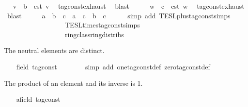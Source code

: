 \begin{isabellebody}
\ \isamarkupfalse%
\ v\ \ {\isacartoucheopen}b\ {\isacharequal}\ {\isasymtau}\isactrlsub c\isactrlsub s\isactrlsub t\ v{\isacartoucheclose}\ \isamarkupfalse%
\ tag{\isacharunderscore}const{\isachardot}exhaust\ \isamarkupfalse%
\ blast\isanewline
\ \ \isamarkupfalse%
\ \isamarkupfalse%
\ w\ \ {\isacartoucheopen}c\ {\isacharequal}\ {\isasymtau}\isactrlsub c\isactrlsub s\isactrlsub t\ w{\isacartoucheclose}\ \isamarkupfalse%
\ tag{\isacharunderscore}const{\isachardot}exhaust\ \isamarkupfalse%
\ blast\isanewline
\ \ \isamarkupfalse%
\ \isamarkupfalse%
\ {\isacartoucheopen}{\isacharparenleft}a\ {\isacharplus}\ b{\isacharparenright}\ {\isacharasterisk}\ c\ {\isacharequal}\ a\ {\isacharasterisk}\ c\ {\isacharplus}\ b\ {\isacharasterisk}\ c{\isacartoucheclose}\isanewline
\ \ \ \ \isamarkupfalse%
\ {\isacharparenleft}simp\ add{\isacharcolon}\ TESL{\isachardot}plus{\isacharunderscore}tag{\isacharunderscore}const{\isachardot}simps\isanewline
\ \ \ \ \ \ \ \ \ \ \ \ \ \ \ \ \ \ TESL{\isachardot}times{\isacharunderscore}tag{\isacharunderscore}const{\isachardot}simps\isanewline
\ \ \ \ \ \ \ \ \ \ \ \ \ \ \ \ \ \ ring{\isacharunderscore}class{\isachardot}ring{\isacharunderscore}distribs{\isacharparenleft}{}{\isacharparenright}{\isacharparenright}\isanewline
{}\isamarkupfalse%
%
\begin{isamarkuptext}%
The neutral elements are distinct.%
\end{isamarkuptext}\isamarkuptrue%
\ \ \isamarkupfalse%
\ {\isacartoucheopen}{\isacharparenleft}{}{\isacharcolon}{\isacharcolon}{\isacharparenleft}{\isacharprime}{\isasymtau}{\isacharcolon}{\isacharcolon}field\ tag{\isacharunderscore}const{\isacharparenright}{\isacharparenright}\ {\isasymnoteq}\ {}{\isacartoucheclose}\isanewline
\ \ \ \ \isamarkupfalse%
\ {\isacharparenleft}simp\ add{\isacharcolon}\ one{\isacharunderscore}tag{\isacharunderscore}const{\isacharunderscore}def\ zero{\isacharunderscore}tag{\isacharunderscore}const{\isacharunderscore}def{\isacharparenright}\isanewline
{}\isamarkupfalse%
%
\begin{isamarkuptext}%
The product of an element and its inverse is 1.%
\end{isamarkuptext}\isamarkuptrue%
\ \ \isamarkupfalse%
\ a{\isacharcolon}{\isacharcolon}{\isacartoucheopen}{\isacharprime}{\isasymtau}{\isacharcolon}{\isacharcolon}field\ tag{\isacharunderscore}const{\isacartoucheclose}\ \isamarkupfalse%

\end{isabellebody}
